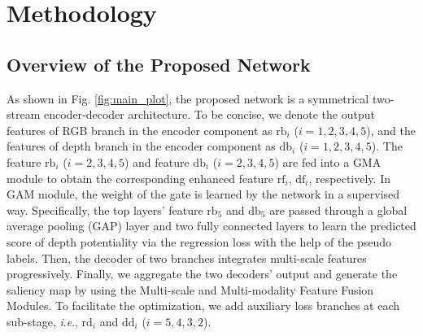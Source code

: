 \documentclass[journal]{IEEEtran}
\newcommand{\ie}{\textit{i}.\textit{e}.}
\begin{document}
\section{Methodology}
\subsection{Overview of the Proposed Network}
As shown in Fig. \ref{fig:main_plot}, the proposed network is a symmetrical two-stream encoder-decoder architecture. To be concise, we denote the output features of RGB branch in the encoder component as $\mathrm{rb}_i$ ($i=1,2,3,4,5$), and the features of depth branch in the encoder component as $\mathrm{db}_i$ ($i=1,2,3,4,5$). The feature $\mathrm{rb}_i$ ($i=2,3,4,5$) and feature $\mathrm{db}_i$ ($i=2,3,4,5$) are fed into a GMA module to obtain the corresponding enhanced feature $\mathrm{rf}_i$, $\mathrm{df}_i$, respectively. In GAM module, the weight of the gate is learned by the network in a supervised way. Specifically, the top layers' feature $\mathrm{rb}_5$ and $\mathrm{db}_5$ are passed through a global average pooling (GAP) layer and two fully connected layers to learn the predicted score of depth potentiality via the regression loss with the help of the pseudo labels.
Then, the decoder of two branches integrates multi-scale features progressively. Finally, we aggregate the two decoders' output and generate the saliency map by using the Multi-scale and Multi-modality Feature Fusion Modules. To facilitate the optimization, we add auxiliary loss branches at each sub-stage, \ie, $\mathrm{rd}_i$ and $\mathrm{dd}_i$ ($i=5,4,3,2$).
\end{document}

